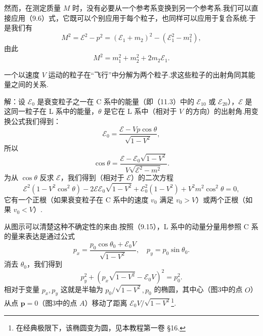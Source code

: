然而，在测定质量 $M$ 时，没有必要从一个参考系变换到另一个参考系.我们可以直接应用（9.6）式，它既可以个别应用于每个粒子，也同样可以应用于复合系统.于是我们有
\begin{equation*}
  M^2=\mathcal{E}^2-p^2=(\mathcal{E}_1+m_2)^2-(\mathcal{E}_1^2-m_1^2),
\end{equation*}
由此
\begin{equation}
  M^2=m_1^2+m_2^2+2m_2\mathcal{E}_1.
\end{equation}

\begin{xiti}

\quad 一个以速度 $V$ 运动的粒子在“飞行”中分解为两个粒子.求这些粒子的出射角同其能量之间的关系.

解：设 $\mathcal{E}_0$ 是衰变粒子之一在 C 系中的能量（即（11.3）中的 $\mathcal{E}_{10}$ 或 $\mathcal{E}_{20}$），$\mathcal{E}$ 是这同一粒子在 L 系中的能量，$\theta$ 是它在 L 系中（相对于 $V$ 的方向）的出射角.用变换公式我们得到：
\begin{equation*}
  \mathcal{E}_0=\frac{\mathcal{E}-Vp\cos\theta}{\sqrt{1-V^2}},
\end{equation*}
所以
\begin{equation*}
  \cos\theta=\frac{\mathcal{E}-\mathcal{E}_0\sqrt{1-V^2}}
  {V\sqrt{\mathcal{E}^2-m^2}}.\tag{1}
\end{equation*}
为从 $\cos\theta$ 反求 $\mathcal{E}$，我们得到（相对于 $\mathcal{E}$）的二次方程
\begin{equation*}
  \mathcal{E}^2(1-V^2\cos^2\theta)-2\mathcal{E}\mathcal{E}_0\sqrt{1-V^2}
  +\mathcal{E}_0^2(1-V^2)+V^2m^2\cos^2\theta=0,\tag{2}
\end{equation*}
它有一个正根（如果衰变粒子在 C 系中的速度 $v_0$ 满足 $v_0>V$）或两个正根（如果 $v_0<V$）.

从图示可以清楚这种不确定性的来由.按照（9.15），L 系中的动量分量用参照 C 系的量来表达是通过公式
\begin{equation*}
  p_x=\frac{p_0\cos\theta_0+\mathcal{E}_0V}{\sqrt{1-V^2}},\quad
  p_y=p_0\sin\theta_0.
\end{equation*}
消去 $\theta_0$，我们得到
\begin{equation*}
  p_y^2+(p_x\sqrt{1-V^2}-\mathcal{E}_0V)^2=p_0^2.
\end{equation*}
相对于变量 $p_x,p_y$ 这就是半轴为 $p_0/\sqrt{1-V^2},p_0$ 的椭圆，其中心（图3中的点 $O$）从点 $\boldsymbol{p}=0$（图3中的点 $A$）移动了距离 $\mathcal{E}_0V/\sqrt{1-V^2}$\footnote{在经典极限下，该椭圆变为圆，见本教程第一卷 §16.}.


\end{xiti}
